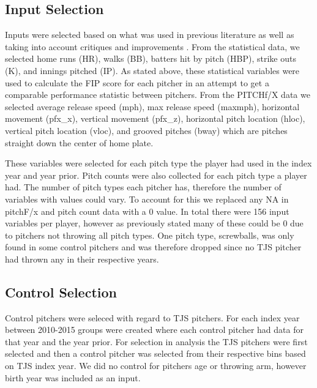 \subsection{Input Selection}

Inputs were selected based on what was used in previous literature as well as taking into account critiques and improvements \cite{Gray2014}. From the statistical data, we selected home runs (HR), walks (BB), batters hit by pitch (HBP), strike outs (K), and innings pitched (IP). As stated above, these statistical variables were used to calculate the FIP score for each pitcher in an attempt to get a comparable performance statistic between pitchers. From the PITCHf/X data we selected average release speed (mph), max release speed (maxmph), horizontal movement (pfx\_x), vertical movement (pfx\_z), horizontal pitch location (hloc), vertical pitch location (vloc), and grooved pitches (bway) which are pitches straight down the center of home plate.

These variables were selected for each pitch type the player had used in the index year and year prior. Pitch counts were also collected for each pitch type a player had. The number of pitch types each pitcher has, therefore the number of variables with values could vary. To account for this we replaced any NA in pitchF/x and pitch count data with a 0 value. In total there were 156 input variables per player, however as previously stated many of these could be 0 due to pitchers not throwing all pitch types. One pitch type, screwballs, was only found in some control pitchers and was therefore dropped since no TJS pitcher had thrown any in their respective years.

\subsection{Control Selection}

Control pitchers were seleced with regard to TJS pitchers. For each index year between 2010-2015 groups were created where each control pitcher had data for that year and the year prior. For selection in analysis the TJS pitchers were first selected and then a control pitcher was selected from their respective bins based on TJS index year. We did no control for pitchers age or throwing arm, however birth year was included as an input.




